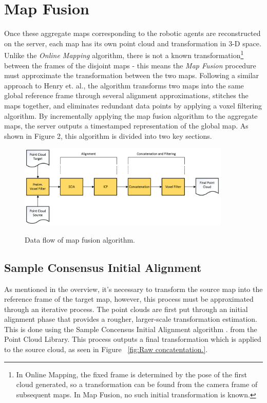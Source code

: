 \documentclass[letterpaper, oneside, 10pt]{report}
\begin{document}
\section{Map Fusion}
\noindent Once these aggregate maps corresponding to the robotic agents are reconstructed on the server, each map has its own point cloud and transformation in 3-D space. Unlike the \textsl{Online Mapping} algorithm, there is not a known transformation\footnote{In Online Mapping, the fixed frame is determined by the pose of the first cloud generated, so a transformation can be found from the camera frame of subsequent maps. In Map Fusion, no such initial transformation is known.} between the frames of the disjoint maps - this means the \textsl{Map Fusion} procedure must approximate the transformation between the two maps. Following a similar approach to Henry et. al.\cite{henry2012rgb}, the algorithm transforms two maps into the same global reference frame through several alignment approximations, stitches the maps together, and eliminates redundant data points by applying a voxel filtering algorithm. By incrementally applying the map fusion algorithm to the aggregate maps, the server outputs a timestamped representation of the global map. As shown in Figure 2, this algorithm is divided into two key sections.

\begin{figure}[h!]
 \caption{Data flow of map fusion algorithm.}
 \centering
   \includegraphics[width=0.9\textwidth]{images/mapfusion}
 \label{fig: map fusion.}
\end{figure}

    \subsection{Sample Consensus Initial Alignment}

    \noindent As mentioned in the overview, it's necessary to transform the source map into the reference frame of the target map, however, this process must be approximated through an iterative process. The point clouds are first put through an initial alignment phase that provides a rougher, larger-scale transformation estimation. This is done using the Sample Concensus Initial Alignment algorithm \cite{rusu2009fast}. from the Point Cloud Library. This process outputs a final transformation which is applied to the source cloud, as seen in Figure ~\ref{fig:Raw concatentation.}.
\end{document}
